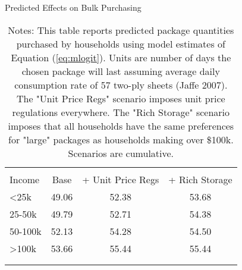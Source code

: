 \begin{table}[!htbp] \centering
\caption{Predicted Effects on Bulk Purchasing}
\label{tab:counterfactualMNLDays}
\begin{tabular}{lccc}
\\[-1.8ex]\hline
\hline \\[-1.8ex]
Income   & Base    & + Unit Price Regs   &  + Rich Storage  \\
\hline
<25k     & 49.06   & 52.38             & 53.68 \\
25-50k   & 49.79   & 52.71              & 54.38 \\
50-100k  & 52.13   & 54.28              & 54.50 \\
>100k    & 53.66   & 55.44              & 55.44 \\
\\[-1.8ex]\hline
\hline \\[-1.8ex]
\end{tabular}
\caption*{Notes: This table reports predicted package quantities purchased by households using model estimates of Equation (\ref{eq:mlogit}). Units are number of days the chosen package will last assuming average daily consumption rate of 57 two-ply sheets (Jaffe 2007). The "Unit Price Regs" scenario imposes unit price regulations everywhere. The "Rich Storage" scenario imposes that all households have the same preferences for "large" packages as households making over \$100k. Scenarios are cumulative.}
\end{table}
